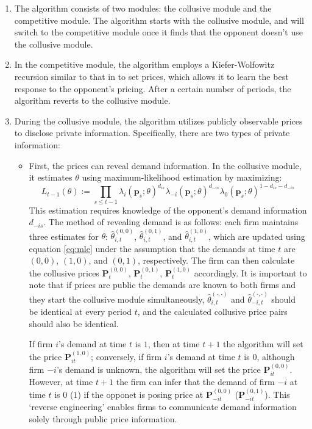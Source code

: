 \documentclass[mnsc,nonblindrev]{workingpaper}
\begin{document}
\begin{enumerate}
    \item The algorithm consists of two modules: the collusive module and the competitive module. The algorithm starts with the collusive module, and will switch to the competitive module once it finds that the opponent doesn't use the collusive module.
    \item In the competitive module, the algorithm employs a Kiefer-Wolfowitz recursion similar to that in \cite{meylahn2022learning} to set prices, which allows it to learn the best response to the opponent's pricing. After a certain number of periods, the algorithm reverts to the collusive module.
    \item During the collusive module, the algorithm utilizes publicly observable prices to disclose private information. Specifically, there are two types of private information:
        \begin{itemize}
            \item First, the prices can reveal demand information. In the collusive module, it estimates $\theta$ using maximum-likelihood estimation by maximizing:
            \begin{equation}
            \label{eq:mle}
                L_{t-1}(\theta):=\prod_{s\le t-1} \lambda_i(\mathbf{p}_s;\theta)^{d_{is}}\lambda_{-i}(\mathbf{p}_s;\theta)^{d_{-is}}\lambda_0(\mathbf{p}_s;\theta)^{1-d_{is}-d_{-is}}
            \end{equation}
            This estimation requires knowledge of the opponent's demand information $d_{-is}$. The method of revealing demand is as follows: each firm maintains three estimates for $\theta$: $\hat{\theta}_{i,t}^{(0,0)}$, $\hat{\theta}_{i,t}^{(0,1)}$, and $\hat{\theta}_{i,t}^{(1,0)}$, which are updated using equation \ref{eq:mle} under the assumption that the demands at time $t$ are $(0,0)$, $(1,0)$, and $(0,1)$, respectively. The firm can then calculate the collusive prices $\mathbf{P}_t^{(0,0)}$, $\mathbf{P}_t^{(0,1)}$, $\mathbf{P}_t^{(1,0)}$ accordingly. It is important to note that if prices are public the demands are known to both firms and they start the collusive module simultaneously, $\hat{\theta}_{i,t}^{(\cdot,\cdot)}$ and $\hat{\theta}_{-i,t}^{(\cdot,\cdot)}$ should be identical at every period $t$, and the calculated collusive price pairs should also be identical.
            
            If firm $i$'s demand at time $t$ is $1$, then at time $t+1$ the algorithm will set the price $\mathbf{P}_{it}^{(1,0)}$; conversely, if firm $i$'s demand at time $t$ is $0$, although firm $-i$'s demand is unknown, the algorithm will set the price $\mathbf{P}_{it}^{(0,0)}$. However, at time $t+1$ the firm can infer that the demand of firm $-i$ at time $t$ is $0$ ($1$) if the opponet is posing price at $\mathbf{P}_{-it}^{(0,0)}$ ($\mathbf{P}_{-it}^{(0,1)}$). This `reverse engineering' enables firms to communicate demand information solely through public price information.
            

\end{itemize}
\end{enumerate}
\end{document}

